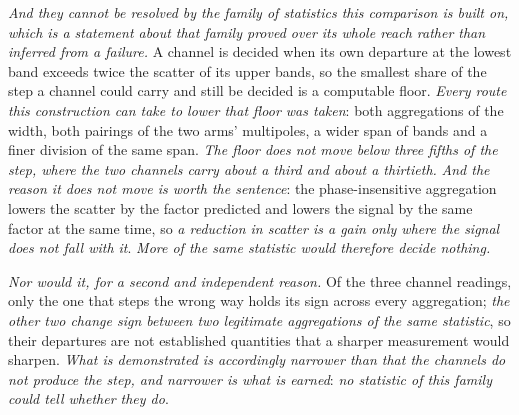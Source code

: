 \documentclass[11pt,a4paper]{article}
\theoremstyle{plain}
\theoremstyle{definition}
\theoremstyle{remark}
\begin{document}
\emph{And they cannot be resolved by the family of statistics this comparison is built on, which is a
statement about that family proved over its whole reach rather than inferred from a failure.} A channel is
decided when its own departure at the lowest band exceeds
twice the scatter of its upper bands, so the smallest share of the step a channel could carry and still be
decided is a computable floor. \emph{Every route this construction can take to lower that floor was taken}:
both aggregations of the width, both pairings of the two arms' multipoles, a wider span of bands and a finer
division of the same span. \emph{The floor does not move below three fifths of the step, where the two
channels carry about a third and about a thirtieth.} \emph{And the reason it does not move is worth the
sentence}: the phase-insensitive aggregation lowers the scatter by the factor predicted and lowers the signal
by the same factor at the same time, so \emph{a reduction in scatter is a gain only where the signal does not
fall with it}. \emph{More of the same statistic would therefore decide nothing.}

\emph{Nor would it, for a second and independent reason.} Of the three channel readings, only the one that
steps the wrong way holds its sign across every aggregation; \emph{the other two change sign between two
legitimate aggregations of the same statistic}, so their departures are not established quantities that a
sharper measurement would sharpen. \emph{What is demonstrated is accordingly narrower than that the channels
do not produce the step, and narrower is what is earned}: \emph{no statistic of this family could tell whether
they do}.
\end{document}
